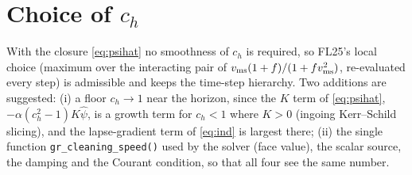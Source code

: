 \documentclass[11pt,a4paper]{article}
\newcommand{\ph}{\hat\psi}
\newcommand{\ch}{c_h}
\newcommand{\code}[1]{\texttt{#1}}
\begin{document}
\section{Choice of $\ch$}
With the closure \eqref{eq:psihat} no smoothness of $\ch$ is required, so FL25's local choice (maximum over the interacting pair of $v_{\rm ms}(1+f)/(1+fv_{\rm ms}^2)$, re-evaluated every step) is admissible and keeps the time-step hierarchy. Two additions are suggested:
(i) a floor $\ch\to1$ near the horizon, since the $K$ term of \eqref{eq:psihat}, $-\alpha(\ch^2-1)K\ph$, is a growth term for $\ch<1$ where $K>0$ (ingoing Kerr--Schild slicing), and the lapse-gradient term of \eqref{eq:ind} is largest there;
(ii) the single function \code{gr\_cleaning\_speed()} used by the solver (face value), the scalar source, the damping and the Courant condition, so that all four see the same number.
\end{document}
